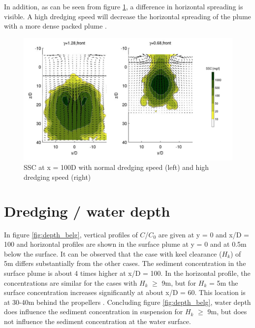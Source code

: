 \noindent In addition, as can be seen from figure \ref{fig:dredging_speed_3}, a difference in horizontal spreading is visible. A high dredging speed will decrease the horizontal spreading of the plume with a more dense packed plume \citep{Dewit}.

\begin{figure}[ht!]
    \centering
    \includegraphics[width = .8\linewidth]{Images/Dredging_Speed_width.png}
    \caption{SSC at x = 100D with normal dredging speed (left) and high dredging speed (right)}
    \label{fig:dredging_speed_3}
\end{figure}














\section{Dredging / water depth}

In figure \ref{fig:depth_belg}, vertical profiles of $C$/$C_0$ are given at y = 0 and x/D = 100 and horizontal profiles are shown in the surface plume at y = 0 and at 0.5m below the surface. It can be observed that the case with keel clearance ($H_k$) of 5m differs substantially from the other cases. The sediment concentration in the surface plume is about 4 times higher at x/D = 100. In the horizontal profile, the concentrations are similar for the cases with $H_k$ $\geq$ 9m, but for $H_k$ = 5m the surface concentration increases significantly at about x/D = 60. This location is at 30-40m behind the propellers \citep{Decrop}. Concluding figure \ref{fig:depth_belg}, water depth does influence the sediment concentration in suspension for $H_k$ $\geq$ 9m, but does not influence the sediment concentration at the water surface.

